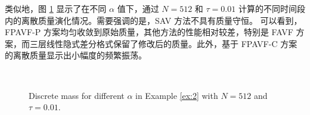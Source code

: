 	类似地，图 \ref{fig:4} 显示了在不同 $\alpha$ 值下，通过 $N=512$ 和 $\tau=0.01$ 计算的不同时间段内的离散质量演化情况。需要强调的是，SAV 方法不具有质量守恒。
可以看到，FPAVF-P 方案均匀收敛到原始质量，其他方法的性能相对较差，特别是 FAVF 方案，而三层线性隐式差分格式保留了修改后的质量。此外，基于 FPAVF-C 方案的离散质量显示出小幅度的频繁振荡。


\begin{figure}[H]
	\begin{center}
	 \\
	 \caption{Discrete mass for different $\alpha$ in Example \ref{ex:2} with $N = 512$ and $\tau=0.01$.} \label{fig:4}
	\end{center}
	\end{figure}

